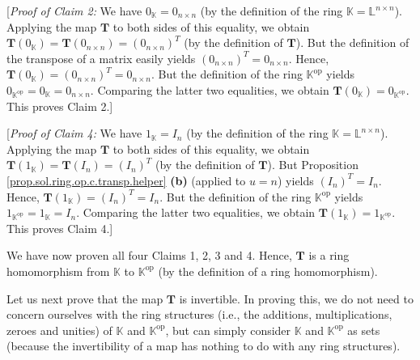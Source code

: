 \documentclass[paper=a4, fontsize=12pt]{scrartcl}%
\theoremstyle{plainsl}
\theoremstyle{definition}
\theoremstyle{remark}
\begin{document}
[\textit{Proof of Claim 2:} We have $0_{\mathbb{K}}=0_{n\times n}$ (by the
definition of the ring $\mathbb{K}=\mathbb{L}^{n\times n}$). Applying the map
$\mathbf{T}$ to both sides of this equality, we obtain $\mathbf{T}\left(
0_{\mathbb{K}}\right)  =\mathbf{T}\left(  0_{n\times n}\right)  =\left(
0_{n\times n}\right)  ^{T}$ (by the definition of $\mathbf{T}$). But the
definition of the transpose of a matrix easily yields $\left(  0_{n\times
n}\right)  ^{T}=0_{n\times n}$. Hence, $\mathbf{T}\left(  0_{\mathbb{K}%
}\right)  =\left(  0_{n\times n}\right)  ^{T}=0_{n\times n}$. But the
definition of the ring $\mathbb{K}^{\operatorname*{op}}$ yields $0_{\mathbb{K}%
^{\operatorname*{op}}}=0_{\mathbb{K}}=0_{n\times n}$. Comparing the latter two
equalities, we obtain $\mathbf{T}\left(  0_{\mathbb{K}}\right)  =0_{\mathbb{K}%
^{\operatorname*{op}}}$. This proves Claim 2.]

[\textit{Proof of Claim 4:} We have $1_{\mathbb{K}}=I_{n}$ (by the definition
of the ring $\mathbb{K}=\mathbb{L}^{n\times n}$). Applying the map
$\mathbf{T}$ to both sides of this equality, we obtain $\mathbf{T}\left(
1_{\mathbb{K}}\right)  =\mathbf{T}\left(  I_{n}\right)  =\left(  I_{n}\right)
^{T}$ (by the definition of $\mathbf{T}$). But Proposition
\ref{prop.sol.ring.op.c.transp.helper} \textbf{(b)} (applied to $u=n$) yields
$\left(  I_{n}\right)  ^{T}=I_{n}$. Hence, $\mathbf{T}\left(  1_{\mathbb{K}%
}\right)  =\left(  I_{n}\right)  ^{T}=I_{n}$. But the definition of the ring
$\mathbb{K}^{\operatorname*{op}}$ yields $1_{\mathbb{K}^{\operatorname*{op}}%
}=1_{\mathbb{K}}=I_{n}$. Comparing the latter two equalities, we obtain
$\mathbf{T}\left(  1_{\mathbb{K}}\right)  =1_{\mathbb{K}^{\operatorname*{op}}%
}$. This proves Claim 4.]

We have now proven all four Claims 1, 2, 3 and 4. Hence, $\mathbf{T}$ is a
ring homomorphism from $\mathbb{K}$ to $\mathbb{K}^{\operatorname*{op}}$ (by
the definition of a ring homomorphism).

Let us next prove that the map $\mathbf{T}$ is invertible. In proving this, we
do not need to concern ourselves with the ring structures (i.e., the
additions, multiplications, zeroes and unities) of $\mathbb{K}$ and
$\mathbb{K}^{\operatorname*{op}}$, but can simply consider $\mathbb{K}$ and
$\mathbb{K}^{\operatorname*{op}}$ as sets (because the invertibility of a map
has nothing to do with any ring structures).
\end{document}
